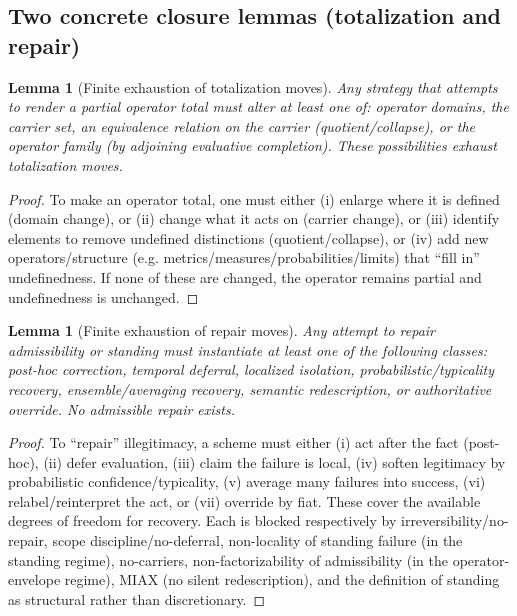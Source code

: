 \documentclass[11pt]{article}
\newtheorem{lemma}[theorem]{Lemma}
\theoremstyle{definition}
\begin{document}
\subsection{Two concrete closure lemmas (totalization and repair)}

\begin{lemma}[Finite exhaustion of totalization moves]
\label{lem:totalization-exhaustion}
Any strategy that attempts to render a partial operator total must alter at least one of:
operator domains, the carrier set, an equivalence relation on the carrier (quotient/collapse), or the operator family (by adjoining evaluative completion).
These possibilities exhaust totalization moves.
\end{lemma}

\begin{proof}
To make an operator total, one must either (i) enlarge where it is defined (domain change), or
(ii) change what it acts on (carrier change), or
(iii) identify elements to remove undefined distinctions (quotient/collapse), or
(iv) add new operators/structure (e.g. metrics/measures/probabilities/limits) that ``fill in'' undefinedness.
If none of these are changed, the operator remains partial and undefinedness is unchanged.
\end{proof}

\begin{lemma}[Finite exhaustion of repair moves]
\label{lem:repair-exhaustion}
Any attempt to repair admissibility or standing must instantiate at least one of the following classes:
post-hoc correction, temporal deferral, localized isolation, probabilistic/typicality recovery, ensemble/averaging recovery,
semantic redescription, or authoritative override.
No admissible repair exists.
\end{lemma}

\begin{proof}
To ``repair'' illegitimacy, a scheme must either (i) act after the fact (post-hoc), (ii) defer evaluation,
(iii) claim the failure is local, (iv) soften legitimacy by probabilistic confidence/typicality,
(v) average many failures into success, (vi) relabel/reinterpret the act, or (vii) override by fiat.
These cover the available degrees of freedom for recovery.
Each is blocked respectively by irreversibility/no-repair, scope discipline/no-deferral, non-locality of standing failure (in the standing regime),
no-carriers, non-factorizability of admissibility (in the operator-envelope regime), MIAX (no silent redescription), and the definition of standing as structural rather than discretionary.
\end{proof}
\end{document}

